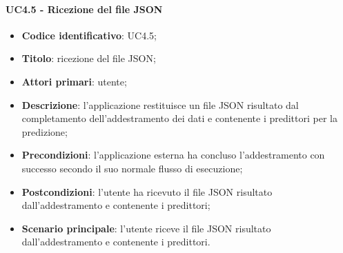 \paragraph{UC4.5 - Ricezione del file JSON}
\begin{itemize}
    \item \textbf{Codice identificativo}: UC4.5;
    \item \textbf{Titolo}: ricezione del file JSON;
    \item \textbf{Attori primari}: utente;
    \item \textbf{Descrizione}: l'applicazione restituisce un file JSON risultato dal completamento dell'addestramento dei dati e contenente i predittori per la predizione;
    \item \textbf{Precondizioni}: l'applicazione esterna ha concluso l'addestramento con successo secondo il suo normale flusso di esecuzione;
    \item \textbf{Postcondizioni}: l'utente ha ricevuto il file JSON risultato dall'addestramento e contenente i predittori;
    \item \textbf{Scenario principale}: l'utente riceve il file JSON risultato dall'addestramento e contenente i predittori.
\end{itemize}